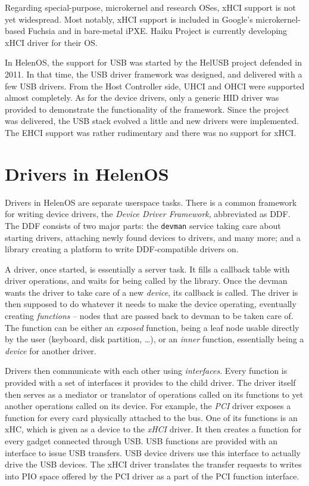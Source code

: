Regarding special-purpose, microkernel and research OSes, xHCI support is not
yet widespread.  Most notably, xHCI support is included in Google's
microkernel-based Fuchsia and in bare-metal iPXE.  Haiku Project is currently
developing xHCI driver for their OS.

In HelenOS, the support for USB was started by the HelUSB project defended in 2011. In that
time, the USB driver framework was designed, and delivered with a few USB
drivers. From the Host Controller side, UHCI and OHCI were supported almost
completely. As for the device drivers, only a generic HID driver was provided
to demonstrate the functionality of the framework. Since the project was
delivered, the USB stack evolved a little and new drivers were implemented.
The EHCI support was rather rudimentary and there was no support for xHCI.

\section{Drivers in HelenOS}

Drivers in HelenOS are separate userspace tasks. There is a common framework
for writing device drivers, the \emph{Device Driver Framework}, abbreviated as
DDF. The DDF consists of two major parts: the \texttt{devman} service taking
care about starting drivers, attaching newly found devices to drivers, and many
more; and a  library creating a platform to write DDF-compatible
drivers on.

A driver, once started, is essentially a server task. It fills a callback table
with driver operations, and waits for being called by the library. Once the
devman wants the driver to take care of a new \emph{device}, its
 callback is called. The driver is then supposed to do whatever
it needs to make the device operating, eventually creating \emph{functions} --
nodes that are passed back to devman to be taken care of. The function can be
either an \emph{exposed} function, being a leaf node usable directly by the user
(keyboard, disk partition, \dots), or an \emph{inner} function, essentially
being a \textit{device} for another driver.

Drivers then communicate with each other using \emph{interfaces}. Every
function is provided with a set of interfaces it provides to the child driver. The
driver itself then serves as a mediator or translator of operations called on
its functions to yet another operations called on its device. For example, the
\emph{PCI} driver exposes a function for every card physically attached to the
bus. One of its functions is an xHC, which is given as a device to the
\emph{xHCI} driver. It then creates a function for every gadget connected
through USB. USB functions are provided with an interface to issue USB
transfers. USB device drivers use this interface to actually drive the USB
devices. The xHCI driver translates the transfer requests to writes into PIO
space offered by the PCI driver as a part of the PCI function interface.

